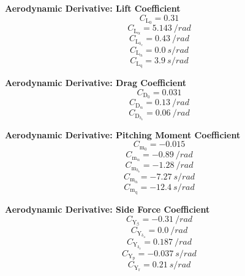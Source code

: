 \documentclass{article}
\begin{document}
\vfill\null
\textbf{Aerodynamic Derivative: Lift Coefficient}
\begin{equation}
C_{\mathrm{L}_{\mathrm{0}}} = 0.31
\end{equation}
\begin{equation}
C_{\mathrm{L}_{\mathrm{\alpha}}} = 5.143\ /rad
\end{equation}
\begin{equation}
C_{\mathrm{L}_{\mathrm{\delta_{\mathrm{e}}}}} = 0.43\ /rad
\end{equation}
\begin{equation}
C_{\mathrm{L}_{\mathrm{\dot{\alpha}}}} = 0.0\ s/rad
\end{equation}
\begin{equation}
C_{\mathrm{L}_{\mathrm{q}}} = 3.9\ s/rad
\end{equation}

\vfill\null
\textbf{Aerodynamic Derivative: Drag Coefficient}
\begin{equation}
C_{\mathrm{D}_{\mathrm{0}}} = 0.031
\end{equation}
\begin{equation}
C_{\mathrm{D}_{\mathrm{\alpha}}} = 0.13\ /rad
\end{equation}
\begin{equation}
C_{\mathrm{D}_{\mathrm{\delta_{\mathrm{e}}}}} = 0.06\ /rad
\end{equation}

\vfill\null
\textbf{Aerodynamic Derivative: Pitching Moment Coefficient}
\begin{equation}
C_{\mathrm{m}_{\mathrm{0}}} = -0.015
\end{equation}
\begin{equation}
C_{\mathrm{m}_{\mathrm{\alpha}}} = -0.89\ /rad
\end{equation}
\begin{equation}
C_{\mathrm{m}_{\mathrm{\delta_{\mathrm{e}}}}} = -1.28\ /rad
\end{equation}
\begin{equation}
C_{\mathrm{m}_{\mathrm{\dot{\alpha}}}} = -7.27\ s/rad
\end{equation}
\begin{equation}
C_{\mathrm{m}_{\mathrm{q}}} = -12.4\ s/rad
\end{equation}

\vfill\null
\textbf{Aerodynamic Derivative: Side Force Coefficient}
\begin{equation}
C_{\mathrm{Y}_{\mathrm{\beta}}} = -0.31\ /rad
\end{equation}
\begin{equation}
C_{\mathrm{Y}_{\mathrm{\delta_{\mathrm{a}}}}} = 0.0\ /rad
\end{equation}
\begin{equation}
C_{\mathrm{Y}_{\mathrm{\delta_{\mathrm{r}}}}} = 0.187\ /rad
\end{equation}
\begin{equation}
C_{\mathrm{Y}_{\mathrm{p}}} = -0.037\ s/rad
\end{equation}
\begin{equation}
C_{\mathrm{Y}_{\mathrm{r}}} = 0.21\ s/rad
\end{equation}
\end{document}
